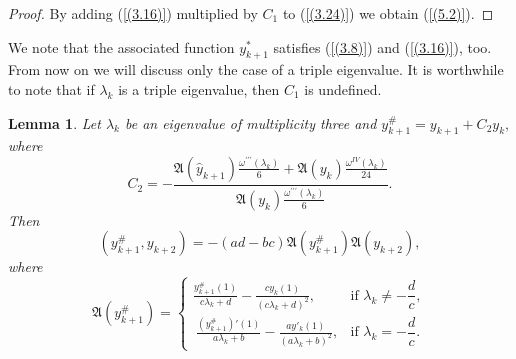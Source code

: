 \documentclass[pdflatex,sn-mathphys-num]{sn-jnl}%
\theoremstyle{thmstyleone}%
\theoremstyle{thmstyletwo}%
\theoremstyle{thmstylethree}%
\newtheorem{lem}[thm]{Lemma}
\theoremstyle{definition}
\theoremstyle{remark}
\numberwithin{equation}{section}
\begin{document}
\begin{proof} By adding (\ref{(3.16)}) multiplied by $C_1$ to (\ref{(3.24)}) we obtain (\ref{(5.2)}).
\end{proof}
We note that the associated function $y_{k+1}^*$ satisfies (\ref{(3.8)}) and (\ref{(3.16)}), too.
From now on we will discuss only the case of a triple eigenvalue. It is worthwhile to note that if $\lambda_k$ is a triple eigenvalue, then $C_1$ is undefined.
\begin{lem}
Let $\lambda_k$ be an eigenvalue of multiplicity three and
\(
y_{k+1}^\# = y_{k+1} + C_2 y_k,
\)
where
\begin{equation}
    C_2=-\frac{\mathfrak{A}(\hat{y}_{k+1})\frac{\omega^{\prime\prime\prime}(\lambda_k)}{6}+\mathfrak{A}(y_k)\frac{\omega^{IV}(\lambda_k)}{24}}{\mathfrak{A}(y_k)\frac{\omega^{\prime\prime\prime}(\lambda_k)}{6}}. \label{(5.3)}
\end{equation}
Then 
\begin{equation}
(y_{k+1}^\#, y_{k+2}) =-(ad-bc)\mathfrak{A}(y_{k+1}^\#)\mathfrak{A}(y_{k+2}), \label{(5.4)}
\end{equation}
where
\begin{equation}
 \mathfrak{A}(y^{\#}_{k+1}) =
\begin{cases}
\displaystyle  
\frac{y^{\#}_{k + 1}(1)}{c\lambda_{k}+d} - \frac{cy_{k}(1)}{{(c\lambda_{k}+d)}^{2}}, 
& \text{if } \lambda_k \neq -\dfrac{d}{c}, \\[10pt]
\displaystyle \ 
\frac{(y^{\#}_{k + 1})'(1)}{a\lambda_{k}+b} - \frac{ay'_{k}(1)}{{(a\lambda_{k}+b)}^{2}}, 
& \text{if } \lambda_k = -\dfrac{d}{c}.
\end{cases} \label{(5.5.1)}  
\end{equation}


\end{lem}
\end{document}
